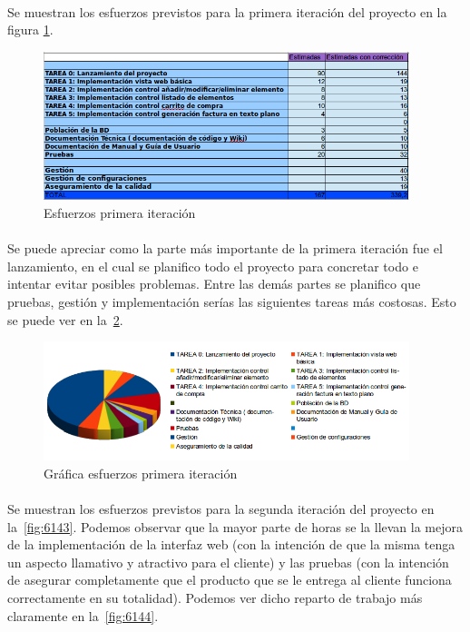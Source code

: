 

\paragraph{} Se muestran los esfuerzos previstos para la primera iteración del proyecto en la figura \ref{fig:6141}.

\begin{figure}[h!]
\centering
\includegraphics[width=0.95\textwidth]{img/6141}
\caption{Esfuerzos primera iteración}
 \label{fig:6141}
\end{figure}

\paragraph{} Se puede apreciar como la parte más importante de la primera iteración fue el lanzamiento, en el cual se planifico todo el proyecto para concretar todo e intentar evitar posibles problemas. Entre las demás partes se planifico que pruebas, gestión y implementación serías las siguientes tareas más costosas. Esto se puede ver en la~\cref{fig:6142}.

\begin{figure}[h!]
\centering
\includegraphics[width=0.95\textwidth]{img/6142}
\caption{Gráfica esfuerzos primera iteración}
 \label{fig:6142}
\end{figure}

\paragraph{} Se muestran los esfuerzos previstos para la segunda iteración del proyecto en la~\cref{fig:6143}. Podemos observar que la mayor parte de horas se la llevan la mejora de la implementación de la interfaz web (con la intención de que la misma tenga un aspecto llamativo y atractivo para el cliente) y las pruebas (con la intención de asegurar completamente que el producto que se le entrega al cliente funciona correctamente en su totalidad). Podemos ver dicho reparto de trabajo más claramente en la~\cref{fig:6144}. 

